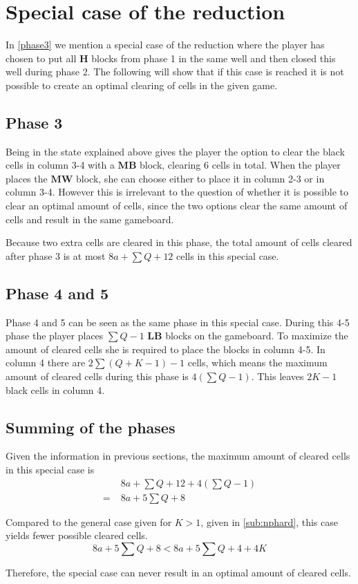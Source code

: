 \section*{Special case of the reduction}
\label{specialcasereduction}

In \ref{phase3} we mention a special case of the reduction where the player has chosen to put all $\mathbf{H}$ blocks from phase 1 in the same well and then closed this well during phase 2. The following will show that if this case is reached it is not possible to create an optimal clearing of cells in the given game.

\subsection*{Phase 3}
Being in the state explained above gives the player the option to clear the black cells in column 3-4 with a $\mathbf{MB}$ block, clearing 6 cells in total. When the player places the $\mathbf{MW}$ block, she can choose either to place it in column 2-3 or in column 3-4. However this is irrelevant to the question of whether it is possible to clear an optimal amount of cells, since the two options clear the same amount of cells and result in the same gameboard.

Because two extra cells are cleared in this phase, the total amount of cells cleared after phase 3 is at most $8a + \sum Q + 12$ cells in this special case.

\subsection*{Phase 4 and 5}

Phase 4 and 5 can be seen as the same phase in this special case. During this 4-5 phase the player places $\sum Q - 1$ $\mathbf{LB}$ blocks on the gameboard. To maximize the amount of cleared cells she is required to place the blocks in column 4-5. In column 4 there are $2 \sum \left( Q + K - 1 \right) - 1$ cells, which means the maximum amount of cleared cells during this phase is $ 4 \left( \sum Q - 1 \right)$. This leaves $2K-1$ black cells in column 4.

\subsection*{Summing of the phases}

Given the information in previous sections, the maximum amount of cleared cells in this special case is
\begin{align*}
  & 8a + \sum Q + 12 + 4 \left( \sum Q - 1 \right) \\
= \; & 8a + 5 \sum Q + 8
\end{align*}

Compared to the general case given for $K > 1$, given in \ref{sub:nphard}, this case yields fewer possible cleared cells.
\begin{equation*}
8a + 5 \sum Q + 8 < 8a + 5 \sum Q + 4 + 4K
\end{equation*}

Therefore, the special case can never result in an optimal amount of cleared cells.
